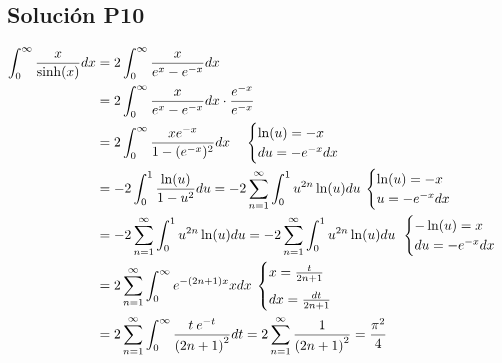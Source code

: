 \begin{CajaTitulo}{\begin{center}\subsection{Solución P10}\end{center}}
    \vspace{0.5cm}
    \begin{align*}
        \int_{0}^{\infty} \frac{x}{\sinh(x)}dx &= 2\int_{0}^{\infty} \frac{x}{e^x - e^{-x}}dx\\
        &= 2\int_{0}^{\infty} \frac{x}{e^x - e^{-x}}dx\cdot \frac{e^{-x}}{e^{-x}}\\
        &= 2\int_{0}^{\infty} \frac{xe^{-x}}{1 - (e^{-x})^2}dx \: \hspace{0.3cm}\cambio{\ln(u) = -x}{du = -e^{-x}dx}\\
        &= -2\int_{0}^{1} \frac{\ln(u)}{1 - u^2}du = -2\sum_{n=1}^{\infty}\int_{0}^{1}u^{2n}\ln(u)du \: \cambio{\ln(u) = -x}{u = -e^{-x}dx} \\
        &= -2\sum_{n=1}^{\infty}\int_{0}^{1}u^{2n}\ln(u)du = -2\sum_{n=1}^{\infty}\int_{0}^{1}u^{2n}\ln(u)du \: \: \cambio{-\ln(u) = x}{du = -e^{-x}dx}\\
        &= 2\sum_{n=1}^{\infty}\int_{0}^{\infty}e^{-(2n+1)x}xdx \: \cambio{x = \frac{t}{2n+1} \vspace{0.2cm}}{dx = \frac{dt}{2n+1}}\\
        &= 2\sum_{n=1}^{\infty}\int_{0}^{\infty}\frac{t\:e^{-t}}{{(2n+1)}^2}dt = 2\sum_{n=1}^{\infty}\frac{1}{{(2n+1)}^2} = \frac{\pi^2}{4}
    \end{align*}
\end{CajaTitulo}